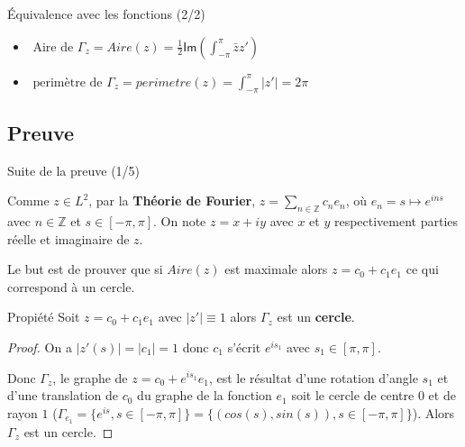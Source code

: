 \documentclass[11pt,envcountsect,aspectratio=169]{beamer} %
\newcommand{\Z}{\mathbb{Z}}
\renewcommand{\Im}{\mathsf{Im}}
\begin{document}
\begin{frame}{Équivalence avec les fonctions (2/2)}

    \begin{itemize}
        \item $\text{ Aire de $\Gamma_z$} = Aire(z)=\frac{1}{2}\Im\left(\int_{-\pi}^{\pi}{\bar{z}z'} \right)$
        \item $ \text{ perimètre de $\Gamma_z$} = perimetre(z) = \int_{-\pi}^{\pi}{|z'|} = 2\pi$
    \end{itemize}
    

    \begin{center}
    \end{center}    

\end{frame}



\subsection{Preuve}

\begin{frame}{Suite de la preuve (1/5)}

    Comme $z \in L^2$, par la \textbf{Théorie de Fourier}, $z = \sum_{n \in \Z}{c_n e_n}$, où $e_n=s \mapsto e^{ins}$ avec $n\in\Z$ et $s \in [-\pi,\pi]$. On note $z = x +i y$ avec $x$ et $y$ respectivement parties réelle et imaginaire de $z$.

    Le but est de prouver que si $Aire(z)$ est maximale alors $z = c_0 + c_1 e_1$ ce qui correspond à un cercle.
    
\begin{beamerboxesrounded}[upper=titreV,lower=texteV,shadow=true]{Propiété}
    Soit $z = c_0 + c_1 e_1$ avec $|z'| \equiv 1$ alors $\Gamma_z$ est un \textbf{cercle}.
\end{beamerboxesrounded}
    
    \begin{proof}
    On a $|z'(s)| = |c_1| = 1$ donc $c_1$ s'écrit $e^{is_1}$ avec $s_1 \in [\pi,\pi]$.
     
    Donc $\Gamma_z$, le graphe de $z = c_0 + e^{is_1} e_1$, est le résultat d'une rotation d'angle $s_1$ et d'une translation de $c_0$ du graphe de la fonction $e_1$ soit le cercle de centre $0$ et de rayon $1$ ($\Gamma_{e_1}=\{e^{is},s\in[-\pi,\pi]\}=\{(cos(s),sin(s)),s\in [-\pi,\pi]\}$). Alors $\Gamma_z$ est un cercle.
    \end{proof}
    
\end{frame}
\end{document}
